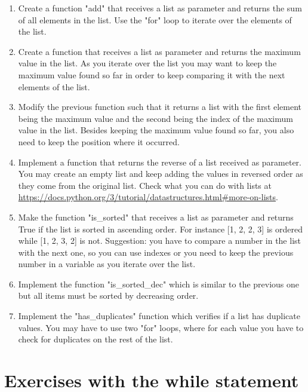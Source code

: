 \begin{enumerate}

\item Create a function "add" that receives a list as parameter and returns the sum of all elements in the list. Use the "for" loop to iterate over the elements of the list.

\item Create a function that receives a list as parameter and returns the maximum value in the list. As you iterate over the list you may want to keep the maximum value found so far in order to keep comparing it with the next elements of the list.

\item Modify the previous function such that it returns a list with the first element being the maximum value and the second being the index of the maximum value in the list. Besides keeping the maximum value found so far, you also need to keep the position where it occurred. 

\item Implement a function that returns the reverse of a list received as parameter. You may create an empty list and keep adding the values in reversed order as they come from the original list. Check what you can do with lists at \url{https://docs.python.org/3/tutorial/datastructures.html#more-on-lists}.

\item Make the function "is\_sorted" that receives a list as parameter and returns True if the list is sorted in ascending order. For instance [1, 2, 2, 3] is ordered while [1, 2, 3, 2] is not. Suggestion: you have to compare a number in the list with the next one, so you can use indexes or you need to keep the previous number in a variable as you iterate over the list.

\item Implement the function "is\_sorted\_dec" which is similar to the previous one but all items must be sorted by decreasing order.

\item Implement the "has\_duplicates" function which verifies if a list has duplicate values. You may have to use two "for" loops, where for each value you have to check for duplicates on the rest of the list.

\end{enumerate}


\section{Exercises with the while statement}

